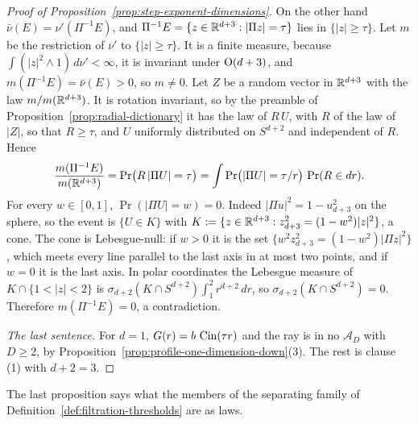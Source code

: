 \begin{proof}[Proof of Proposition~\ref{prop:step-exponent-dimensions}]
On the other hand $\bar\nu(E) = \nu'(\Pi^{-1}E)$, and
$\Pi^{-1}E = \{z \in \mathbb{R}^{d+3} : |\Pi z| = \tau\}$ lies in $\{|z| \ge \tau\}$. Let $m$ be the
restriction of $\nu'$ to $\{|z| \ge \tau\}$. It is a finite measure, because
$\int(|z|^2 \wedge 1)\,d\nu' < \infty$, it is invariant under $\mathrm{O}(d+3)$, and
$m(\Pi^{-1}E) = \bar\nu(E) > 0$, so $m \ne 0$. Let $Z$ be a random vector in $\mathbb{R}^{d+3}$ with the
law $m/m(\mathbb{R}^{d+3})$. It is rotation invariant, so by the preamble of
Proposition~\ref{prop:radial-dictionary} it has the law of $R\,U$, with $R$ of the law of $|Z|$, so that
$R \ge \tau$, and $U$ uniformly distributed on $S^{d+2}$ and independent of $R$. Hence
\[
  \frac{m(\Pi^{-1}E)}{m(\mathbb{R}^{d+3})} = \Pr\bigl(R\,|\Pi U| = \tau\bigr)
   = \int \Pr\bigl(|\Pi U| = \tau/r\bigr)\,\Pr(R \in dr) .
\]
For every $w \in [0,1]$, $\Pr(|\Pi U| = w) = 0$. Indeed $|\Pi u|^2 = 1 - u_{d+3}^2$ on the
sphere, so the event is $\{U \in K\}$ with $K := \{z \in \mathbb{R}^{d+3} : z_{d+3}^2 = (1-w^2)|z|^2\}$,
a cone. The cone is Lebesgue-null: if $w > 0$ it is the set
$\{w^2z_{d+3}^2 = (1-w^2)|\Pi z|^2\}$, which meets every line parallel to the last axis in at
most two points, and if $w = 0$ it is the last axis. In polar coordinates the Lebesgue measure
of $K \cap \{1 < |z| < 2\}$ is $\sigma_{d+2}(K \cap S^{d+2})\int_1^2 r^{d+2}\,dr$, so
$\sigma_{d+2}(K \cap S^{d+2}) = 0$. Therefore $m(\Pi^{-1}E) = 0$, a contradiction.

\emph{The last sentence.} For $d = 1$, $G(r) = b\,\operatorname{Cin}(\tau r)$ and the ray is in no
$\mathcal{A}_D$ with $D \ge 2$, by Proposition~\ref{prop:profile-one-dimension-down}(3). The rest is clause
(1) with $d + 2 = 3$.
\end{proof}

The last proposition says what the members of the separating family of
Definition~\ref{def:filtration-thresholds} are as laws.

